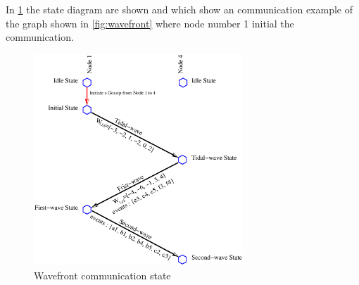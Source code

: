 In \cref{fig:wavefront_communication} the state diagram are shown and which show an communication example of the graph shown in \cref{fig:wavefront} where node number 1 initial the communication.

\begin{figure}[ht]
	\centering
	\includegraphics[width=0.7\textwidth]{fig/wavefront_communication.eps}
	\caption{Wavefront communication state}
	\label{fig:wavefront_communication}
\end{figure}

